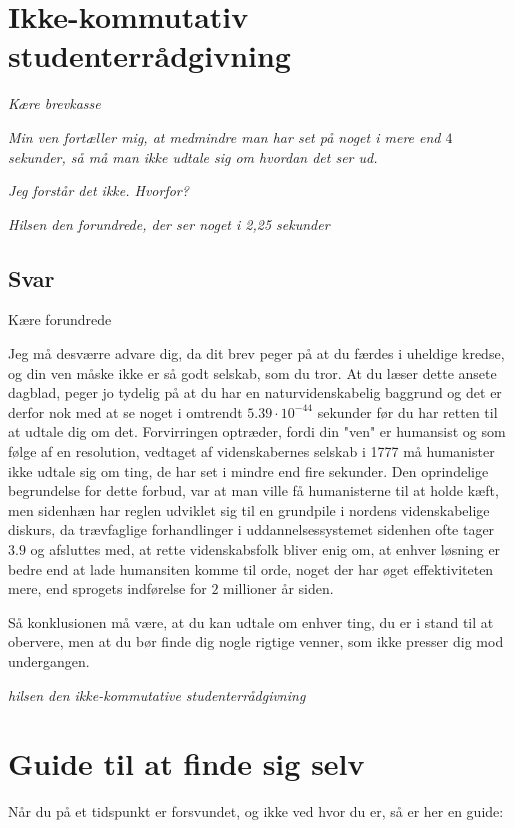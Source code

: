 \begin{minipage}[t]{170mm}
\vspace{3mm}
\section*{Ikke-kommutativ studenterrådgivning}
\emph{Kære brevkasse}

\emph{Min ven fortæller mig, at medmindre man har set på noget i mere end $4$ sekunder, så må man ikke udtale sig om hvordan det ser ud.}

\emph{Jeg forstår det ikke. Hvorfor?}

\emph{Hilsen den forundrede, der ser noget i 2,25 sekunder}

\subsection*{Svar}
Kære forundrede

Jeg må desværre advare dig, da dit brev peger på at du færdes i uheldige kredse, og din ven måske ikke er så godt selskab, som du tror. At du læser dette ansete dagblad, peger jo tydelig på at du har en naturvidenskabelig baggrund og det er derfor nok med at se noget i omtrendt $5.39 \cdot 10^{-44}$ sekunder før du har retten til at udtale dig om det. Forvirringen optræder, fordi din "ven" er humansist og som følge af en resolution, vedtaget af videnskabernes selskab i 1777 må humanister ikke udtale sig om ting, de har set i mindre end fire sekunder. Den oprindelige begrundelse for dette forbud, var at man ville få humanisterne til at holde kæft, men sidenhæn har reglen udviklet sig til en grundpile i nordens videnskabelige diskurs, da trævfaglige forhandlinger i uddannelsessystemet sidenhen ofte tager $3.9$ og afsluttes med, at rette videnskabsfolk bliver enig om, at enhver løsning er bedre end at lade humansiten komme til orde, noget der har øget effektiviteten mere, end sprogets indførelse for $2$ millioner år siden. 

Så konklusionen må være, at du kan udtale om enhver ting, du er i stand til at obervere, men at du bør finde dig nogle rigtige venner, som ikke presser dig mod undergangen.

{\flushright\emph{hilsen den ikke-kommutative studenterrådgivning}}


\vspace{3mm}
\section*{Guide til at finde sig selv}
Når du på et tidspunkt er forsvundet, og ikke ved hvor du er, så er her en guide:


\end{minipage}
